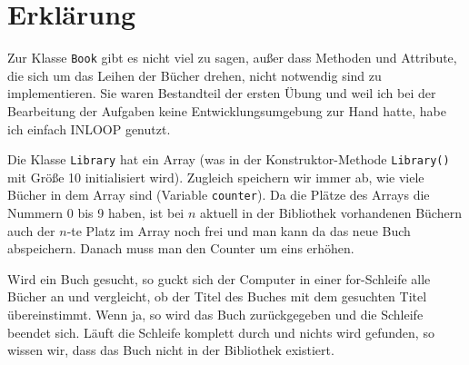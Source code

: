 \documentclass{article}
\begin{document}
	\section*{Erklärung}
	Zur Klasse \texttt{Book} gibt es nicht viel zu sagen, außer dass Methoden und Attribute, die sich um das Leihen der Bücher drehen, nicht notwendig sind zu implementieren. Sie waren Bestandteil der ersten Übung und weil ich bei der Bearbeitung der Aufgaben keine Entwicklungsumgebung zur Hand hatte, habe ich einfach INLOOP genutzt.
	
	Die Klasse \texttt{Library} hat ein Array (was in der Konstruktor-Methode \texttt{Library()} mit Größe 10 initialisiert wird). Zugleich speichern wir immer ab, wie viele Bücher in dem Array sind (Variable \texttt{counter}). Da die Plätze des Arrays die Nummern 0 bis 9 haben, ist bei $n$ aktuell in der Bibliothek vorhandenen Büchern auch der $n$-te Platz im Array noch frei und man kann da das neue Buch abspeichern. Danach muss man den Counter um eins erhöhen.
	
	Wird ein Buch gesucht, so guckt sich der Computer in einer for-Schleife alle Bücher an und vergleicht, ob der Titel des Buches mit dem gesuchten Titel übereinstimmt. Wenn ja, so wird das Buch zurückgegeben und die Schleife beendet sich. Läuft die Schleife komplett durch und nichts wird gefunden, so wissen wir, dass das Buch nicht in der Bibliothek existiert.
	
\end{document}

